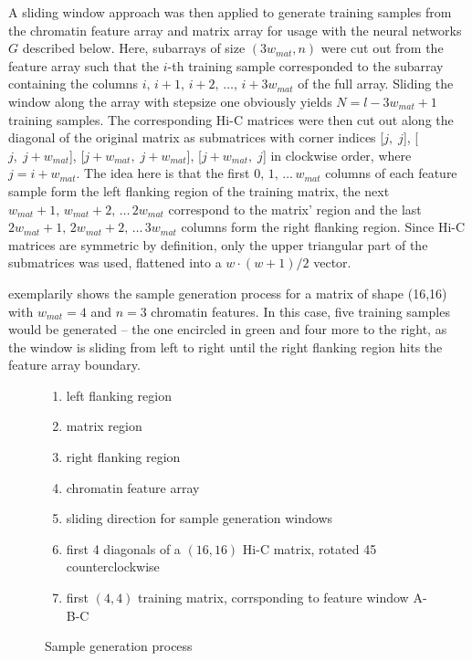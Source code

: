A sliding window approach was then applied to generate training samples from the chromatin feature array and matrix array 
for usage with the neural networks $G$ described below.
Here, subarrays of size $(3w_\mathit{mat}, n)$ were cut out from the feature array 
such that the $i$-th training sample corresponded to the subarray containing the columns $i,\,i+1,\,i+2,\,\dots,\,i+3w_\mathit{mat}$ of the full array. 
Sliding the window along the array with stepsize one obviously yields $N=l-3w_\mathit{mat}+1$ training samples.
The corresponding Hi-C matrices were then cut out along the diagonal of the original matrix 
as submatrices with corner indices [$j,\;j$], [$j,\;j+w_\mathit{mat}$], [$j+w_\mathit{mat},\;j+w_\mathit{mat}$], [$j+w_\mathit{mat},\;j$] in clockwise order, where $j=i+w_\mathit{mat}$.
The idea here is that the first $0,\,1,\,\dots \,w_\mathit{mat}$ columns of each feature sample form the left flanking region of the training matrix, 
the next $w_\mathit{mat}+1,\,w_\mathit{mat}+2,\,\dots \,2w_\mathit{mat}$ correspond to the matrix' region and the last $2w_\mathit{mat}+1,\,2w_\mathit{mat}+2,\,\dots \,3w_\mathit{mat}$ columns form the right flanking region.
Since Hi-C matrices are symmetric by definition, only the upper triangular part of the submatrices was used, 
flattened into a $w\cdot (w+1)/2$ vector.

 exemplarily shows the sample generation process for a matrix of shape (16,16) with $w_\mathit{mat}=4$ and $n=3$ chromatin features.
In this case, five training samples would be generated -- the one encircled in green and four more to the right, as the window is sliding from left to right until the
right flanking region hits the feature array boundary.
\begin{figure}[hbp]
 \begin{minipage}{0.65\textwidth}
    \caption{Sample generation process}
    \label{fig:methods:sample_gen}
 \end{minipage}\hfill
 \begin{minipage}{0.3\textwidth}
 \scriptsize
  \begin{enumerate}[label=\Alph*:,leftmargin=*]
   \raggedright
    \item left flanking region
    \item matrix region
    \item right flanking region
    \item chromatin feature array
    \item sliding direction for sample generation windows
    \item first 4 diagonals of a $(16, 16)$ Hi-C matrix, rotated \SI{45}{\deg} counterclockwise
    \item first $(4, 4)$ training matrix, corrsponding to feature window A-B-C
\end{enumerate}
 \end{minipage}
\end{figure}

